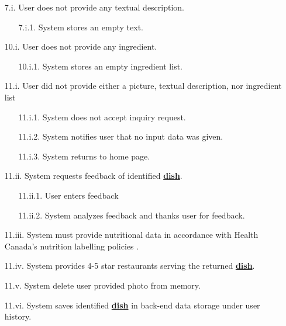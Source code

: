 \documentclass[]{article}
\begin{document}
\begin{enumerate}[{\bf BE1.}]
		\begin{enumerate}
			\item[7.i.] User does not provide any textual description.
			\begin{enumerate}
				\item[7.i.1.] System stores an empty text.
			\end{enumerate}
		\end{enumerate}
		\begin{enumerate}
			\item[10.i.] User does not provide any ingredient.
			\begin{enumerate}
				\item[10.i.1.] System stores an empty ingredient list.
			\end{enumerate}
		\end{enumerate}
		\begin{enumerate}
			\item[11.i.] User did not provide either a picture, textual description, nor ingredient list
			\begin{enumerate}
				\item[11.i.1.] System does not accept inquiry request.
				\item[11.i.2.] System notifies user that no input data was given.
				\item[11.i.3.] System returns to home page.
			\end{enumerate}
			\item[11.ii.] System requests feedback of identified \hyperref[Dish]{\textbf{dish}}.
			\begin{enumerate}
				\item[11.ii.1.] User enters feedback
				\item[11.ii.2.] System analyzes feedback and thanks user for feedback.
			\end{enumerate}
			\item[11.iii.] System must provide nutritional data in accordance with Health Canada's nutrition labelling policies \cite{CanadaNutrition}.
			\item[11.iv.] System provides 4-5 star restaurants serving the returned \hyperref[Dish]{\textbf{dish}}.
			\item[11.v.] System delete user provided photo from memory.
			\item[11.vi.] System saves identified \hyperref[Dish]{\textbf{dish}} in back-end data storage under user history.
		\end{enumerate}


\end{enumerate}
\end{document}

